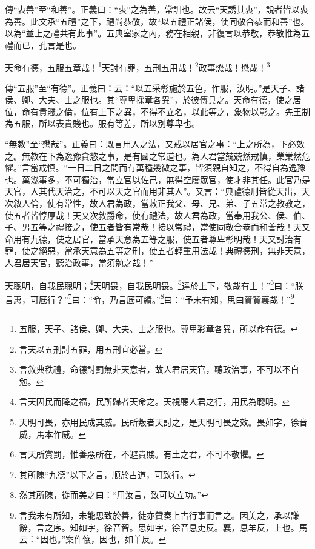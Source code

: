 {\noindent\zhuan{}\fzbyks 傳“衷善”至“和善”。正義曰：“衷”之為善，常訓也。故云“天誘其衷”，說者皆以衷為善。此文承“五禮”之下，禮尚恭敬，故“以五禮正諸侯，使同敬合恭而和善”也。以為“並上之禮共有此事”。五典室家之內，務在相親，非復言以恭敬，恭敬惟為五禮而已，孔言是也。 \par}

天命有德，五服五章哉！\footnote{五服，天子、諸侯、卿、大夫、士之服也。尊卑彩章各異，所以命有德。}天討有罪，五刑五用哉！\footnote{言天以五刑討五罪，用五刑宜必當。}政事懋哉！懋哉！\footnote{言敘典秩禮，命德討罰無非天意者，故人君居天官，聽政治事，不可以不自勉。}

{\noindent\zhuan{}\fzbyks 傳“五服”至“有德”。正義曰：云：“以五采彰施於五色，作服，汝明。”是天子、諸侯、卿、大夫、士之服也。其“尊卑採章各異”，於彼傳具之。天命有德，使之居位，命有貴賤之倫，位有上下之異，不得不立名，以此等之，象物以彰之。先王制為五服，所以表貴賤也。服有等差，所以別尊卑也。 \par}

{\noindent\shu{}\fzkt “無教”至“懋哉”。正義曰：既言用人之法，又戒以居官之事：“上之所為，下必效之。無教在下為逸豫貪慾之事，是有國之常道也。為人君當兢兢然戒慎，業業然危懼。”言當戒慎。“一日二日之間而有萬種幾微之事，皆須親自知之，不得自為逸豫也。萬幾事多，不可獨治，當立官以佐己，無得空廢眾官，使才非其任。此官乃是天官，人其代天治之，不可以天之官而用非其人”。又言：“典禮德刑皆從天出，天次敘人倫，使有常性，故人君為政，當敕正我父、母、兄、弟、子五常之教教之，使五者皆惇厚哉！天又次敘爵命，使有禮法，故人君為政，當奉用我公、侯、伯、子、男五等之禮接之，使五者皆有常哉！接以常禮，當使同敬合恭而和善哉！天又命用有九德，使之居官，當承天意為五等之服，使五者尊卑彰明哉！天又討治有罪，使之絕惡，當承天意為五等之刑，使五者輕重用法哉！典禮德刑，無非天意，人君居天官，聽治政事，當須勉之哉！” \par}

天聰明，自我民聰明；\footnote{言天因民而降之福，民所歸者天命之。天視聽人君之行，用民為聰明。}天明畏，自我民明畏。\footnote{天明可畏，亦用民成其威。民所叛者天討之，是天明可畏之效。畏如字，徐音威，馬本作威。}達於上下，敬哉有土！”\footnote{言天所賞罰，惟善惡所在，不避貴賤。有土之君，不可不敬懼。}曰：“朕言惠，可厎行？”\footnote{其所陳“九德”以下之言，順於古道，可致行。}曰：“俞，乃言厎可績。”\footnote{然其所陳，從而美之曰：“用汝言，致可以立功。”}曰：“予未有知，思曰贊贊襄哉！”\footnote{言我未有所知，未能思致於善，徒亦贊奏上古行事而言之。因美之，承以謙辭，言之序。知如字，徐音智。思如字，徐音息吏反。襄，息羊反，上也。馬云：“因也。”案作儴，因也，如羊反。}

